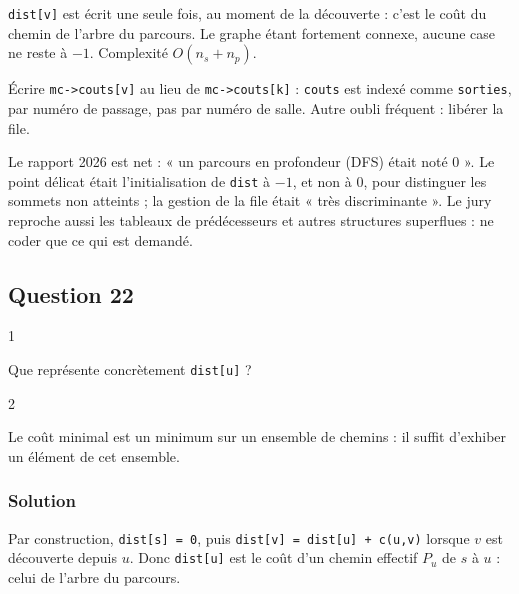 \documentclass[11pt,a4paper]{article}
\begin{document}
\texttt{dist{[}v{]}} est écrit une seule fois, au moment de la découverte : c'est le coût du chemin de l'arbre du parcours. Le graphe étant fortement connexe, aucune case ne reste à \(-1\). Complexité \(O(n_s + n_p)\).

\begin{piege}

Écrire \texttt{mc-\textgreater{}couts{[}v{]}} au lieu de \texttt{mc-\textgreater{}couts{[}k{]}} : \texttt{couts} est indexé comme \texttt{sorties}, par numéro de passage, pas par numéro de salle. Autre oubli fréquent : libérer la file.

\end{piege}

\begin{jury}

Le rapport 2026 est net : « un parcours en profondeur (DFS) était noté 0 ». Le point délicat était l'initialisation de \texttt{dist} à \(-1\), et non à 0, pour distinguer les sommets non atteints ; la gestion de la file était « très discriminante ». Le jury reproche aussi les tableaux de prédécesseurs et autres structures superflues : ne coder que ce qui est demandé.

\end{jury}

\hypertarget{question-22}{%
\subsection{Question 22}\label{question-22}}

\begin{indication}{1}

Que représente concrètement \texttt{dist{[}u{]}} ?

\end{indication}

\begin{indication}{2}

Le coût minimal est un minimum sur un ensemble de chemins : il suffit d'exhiber un élément de cet ensemble.

\end{indication}

\hypertarget{solution-21}{%
\subsubsection{Solution}\label{solution-21}}

Par construction, \texttt{dist{[}s{]}\ =\ 0}, puis \texttt{dist{[}v{]}\allowbreak{}\ =\allowbreak{}\ dist{[}u{]}\allowbreak{}\ +\ c(\allowbreak{}u,\allowbreak{}v)\allowbreak{}} lorsque \(v\) est découverte depuis \(u\). Donc \texttt{dist{[}u{]}} est le coût d'un chemin effectif \(P_u\) de \(s\) à \(u\) : celui de l'arbre du parcours.
\end{document}
